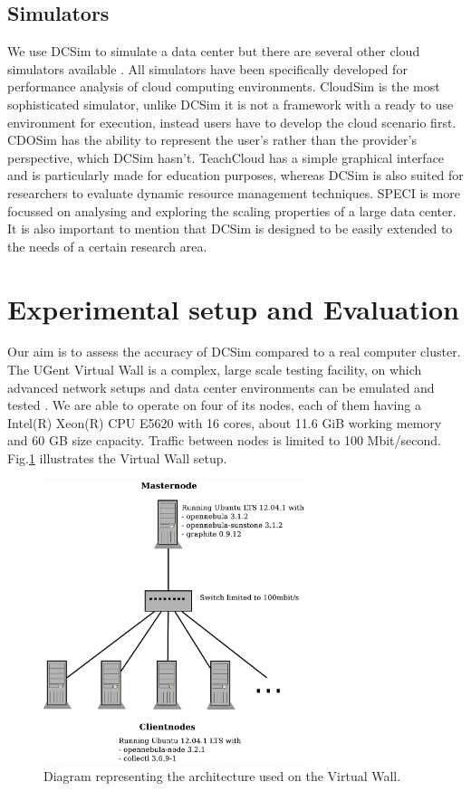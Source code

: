 \documentclass[conference, 10pt]{IEEEtran}
\begin{document}
\subsection{Simulators}
We use DCSim to simulate a data center but there are several other cloud simulators available \cite{cloudcomputing:comparison}.  All simulators have been specifically developed for performance analysis of cloud computing environments. CloudSim is the most sophisticated simulator, unlike DCSim it is not a framework with a ready to use environment for execution, instead users have to develop the cloud scenario first. CDOSim has the ability to represent the user's rather than the provider's perspective, which DCSim hasn't. TeachCloud has a simple graphical interface and is particularly made for education purposes, whereas DCSim is also suited for researchers to evaluate dynamic resource management techniques. SPECI is more focussed on analysing and exploring the scaling properties of a large data center. It is also important to mention that DCSim is designed to be easily extended to the needs of a certain research area. 

\section{Experimental setup and Evaluation}
\label{sec:setupandeval}
Our aim is to assess the accuracy of DCSim compared to a real computer cluster. The UGent Virtual Wall is a complex, large scale testing facility, on which advanced network setups and data center environments can be emulated and tested \cite{virtualwall}. We are able to operate on four of its nodes, each of them having a Intel(R) Xeon(R) CPU E5620 with 16 cores, about 11.6 GiB working memory and 60 GB size capacity. Traffic between nodes is limited to 100 Mbit/second. Fig.\xspace\ref{fig:vwsetup} illustrates the Virtual Wall setup.

\begin{figure}
\centering
\includegraphics[width=3in]{includes/DiagramOpstelling}
\caption{Diagram representing the architecture used on the Virtual Wall.}
\label{fig:vwsetup}
\end{figure}
\end{document}
